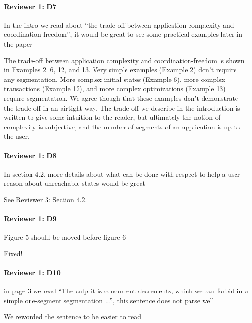 \documentclass[9pt]{article}
\begin{document}
\begin{multicols*}{2}
\paragraph{Reviewer 1: D7}
\begin{feedback}
  In the intro we read about ``the trade-off between application complexity and
  coordination-freedom'', it would be great to see some practical examples later
  in the paper
\end{feedback}
The trade-off between application complexity and coordination-freedom is shown
in Examples 2, 6, 12, and 13. Very simple examples (Example 2) don't require
any segmentation. More complex initial states (Example 6), more complex
transactions (Example 12), and more complex optimizations (Example 13) require
segmentation. We agree though that these examples don't demonstrate the
trade-off in an airtight way. The trade-off we describe in the introduction is
written to give some intuition to the reader, but ultimately the notion of
complexity is subjective, and the number of segments of an application is up to
the user.

\paragraph{Reviewer 1: D8}
\begin{feedback}
  In section 4.2, more details about what can be done with respect to help a
  user reason about unreachable states would be great
\end{feedback}
See Reviewer 3: Section 4.2.

\paragraph{Reviewer 1: D9}
\begin{feedback}
  Figure 5 should be moved before figure 6
\end{feedback}
Fixed!

\paragraph{Reviewer 1: D10}
\begin{feedback}
  in page 3 we read ``The culprit is concurrent decrements, which we can forbid
  in a simple one-segment segmentation ...'', this sentence does not parse well
\end{feedback}
We reworded the sentence to be easier to read.


\end{multicols*}
\end{document}
